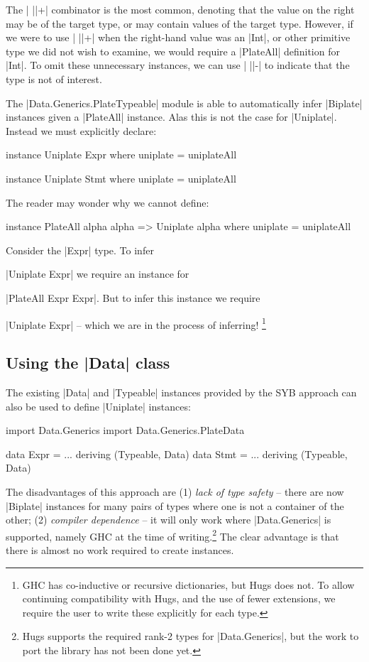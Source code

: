 The | ||+| combinator is the most common, denoting that the value on the right may be of the target type, or may contain values of the target type. However, if we were to use | ||+| when the right-hand value was an |Int|, or other primitive type we did not wish to examine, we would require a |PlateAll| definition for |Int|. To omit these unnecessary instances, we can use | ||-| to indicate that the type is not of interest.

The |Data.Generics.PlateTypeable| module is able to automatically infer |Biplate| instances given a |PlateAll| instance. Alas this is not the case for |Uniplate|. Instead we must explicitly declare:

\begin{code}
instance Uniplate Expr where
    uniplate = uniplateAll

instance Uniplate Stmt where
    uniplate = uniplateAll
\end{code}

The reader may wonder why we cannot define:

\begin{code}
instance PlateAll alpha alpha => Uniplate alpha where
    uniplate = uniplateAll
\end{code}

Consider the |Expr| type. To infer \ignore|Uniplate Expr| we require an instance for \ignore|PlateAll Expr Expr|. But to infer this instance we require \ignore|Uniplate Expr| -- which we are in the process of inferring! \footnote{GHC has co-inductive or recursive dictionaries, but Hugs does not. To allow continuing compatibility with Hugs, and the use of fewer extensions, we require the user to write these explicitly for each type.}


\subsection{Using the |Data| class}
\label{secU:implement_playdata}

The existing |Data| and |Typeable| instances provided by the SYB approach can also be used to define |Uniplate| instances:

\ignore\begin{code}
import Data.Generics
import Data.Generics.PlateData

data Expr  = ... \? \? deriving (Typeable, Data)
data Stmt  = ... \? \? deriving (Typeable, Data)
\end{code}

The disadvantages of this approach are (1) \textit{lack of type safety} -- there are now |Biplate| instances for many pairs of types where one is not a container of the other; (2) \textit{compiler dependence} -- it will only work where |Data.Generics| is supported, namely GHC at the time of writing.\footnote{Hugs supports the required rank-2 types for |Data.Generics|, but the work to port the library has not been done yet.} The clear advantage is that there is almost no work required to create instances.

